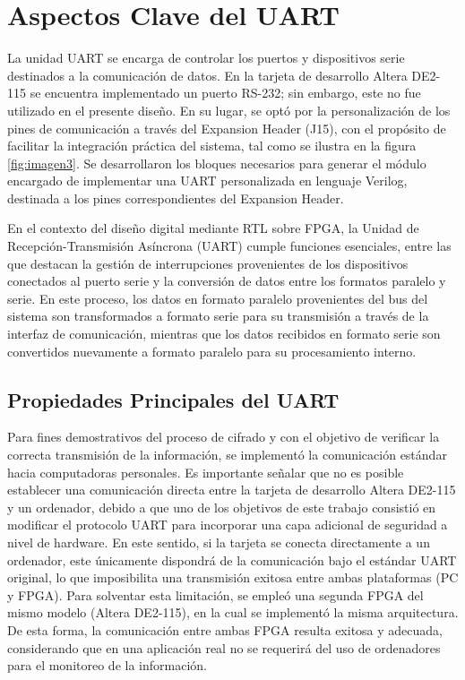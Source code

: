 \clearpage

\section{Aspectos Clave del UART}

La unidad UART se encarga de controlar los puertos y dispositivos serie destinados a la comunicación de datos. En la tarjeta de desarrollo Altera DE2-115 se encuentra implementado un puerto RS-232; sin embargo, este no fue utilizado en el presente diseño. En su lugar, se optó por la personalización de los pines de comunicación a través del Expansion Header (J15), con el propósito de facilitar la integración práctica del sistema, tal como se ilustra en la figura \ref{fig:imagen3}. Se desarrollaron los bloques necesarios para generar el módulo encargado de implementar una UART personalizada en lenguaje Verilog, destinada a los pines correspondientes del Expansion Header.

En el contexto del diseño digital mediante RTL sobre FPGA, la Unidad de Recepción-Transmisión Asíncrona (UART) cumple funciones esenciales, entre las que destacan la gestión de interrupciones provenientes de los dispositivos conectados al puerto serie y la conversión de datos entre los formatos paralelo y serie. En este proceso, los datos en formato paralelo provenientes del bus del sistema son transformados a formato serie para su transmisión a través de la interfaz de comunicación, mientras que los datos recibidos en formato serie son convertidos nuevamente a formato paralelo para su procesamiento interno.

\subsection{Propiedades Principales del UART}

Para fines demostrativos del proceso de cifrado y con el objetivo de verificar la correcta transmisión de la información, se implementó la comunicación estándar hacia computadoras personales. Es importante señalar que no es posible establecer una comunicación directa entre la tarjeta de desarrollo Altera DE2-115 y un ordenador, debido a que uno de los objetivos de este trabajo consistió en modificar el protocolo UART para incorporar una capa adicional de seguridad a nivel de hardware. En este sentido, si la tarjeta se conecta directamente a un ordenador, este únicamente dispondrá de la comunicación bajo el estándar UART original, lo que imposibilita una transmisión exitosa entre ambas plataformas (PC y FPGA). Para solventar esta limitación, se empleó una segunda FPGA del mismo modelo (Altera DE2-115), en la cual se implementó la misma arquitectura. De esta forma, la comunicación entre ambas FPGA resulta exitosa y adecuada, considerando que en una aplicación real no se requerirá del uso de ordenadores para el monitoreo de la información.


